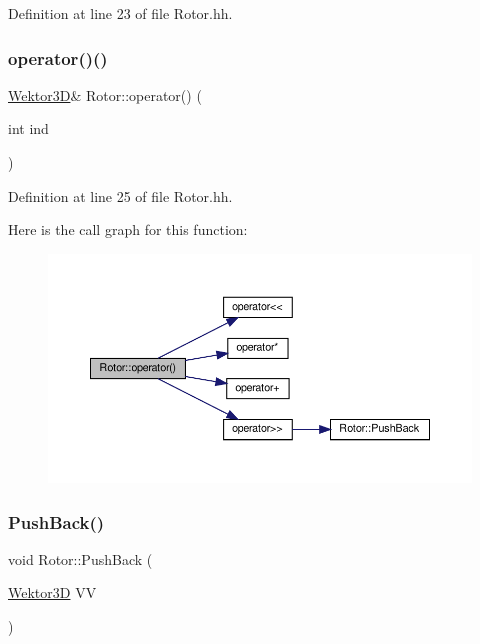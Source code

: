Definition at line 23 of file Rotor.\+hh.

\mbox{\label{class_rotor_ad43dd1c9b8def16cdbae6b12b4968f23}} 
\subsubsection{\texorpdfstring{operator()()}{operator()()}\hspace{0.1cm}{\footnotesize\ttfamily [2/2]}}
{\footnotesize\ttfamily \hyperlink{_wektor3_d_8hh_ac353a272b38b4ad342f7181ad7bdb91a}{Wektor3D}\& Rotor\+::operator() (\begin{DoxyParamCaption}\item[{int}]{ind }\end{DoxyParamCaption})\hspace{0.3cm}{\ttfamily [inline]}}



Definition at line 25 of file Rotor.\+hh.

Here is the call graph for this function\+:
\nopagebreak
\begin{figure}[H]
\begin{center}
\leavevmode
\includegraphics[width=350pt]{class_rotor_ad43dd1c9b8def16cdbae6b12b4968f23_cgraph}
\end{center}
\end{figure}
\mbox{\label{class_rotor_a987eda3f97cef17d1201057078185ad6}} 
\subsubsection{\texorpdfstring{Push\+Back()}{PushBack()}}
{\footnotesize\ttfamily void Rotor\+::\+Push\+Back (\begin{DoxyParamCaption}\item[{\hyperlink{_wektor3_d_8hh_ac353a272b38b4ad342f7181ad7bdb91a}{Wektor3D}}]{VV }\end{DoxyParamCaption})\hspace{0.3cm}{\ttfamily [inline]}}



